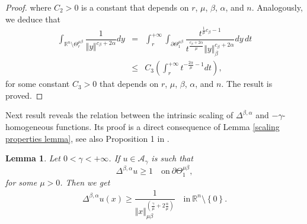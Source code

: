 \documentclass[10pt, leqno]{article}
\newtheorem{lemma}[theorem]{Lemma}
\theoremstyle{definition}
\theoremstyle{remark}
\numberwithin{equation}{section}
\begin{document}
\begin{proof}
where $C_{2}>0$ is a constant that depends on $r$, $\mu$, $\beta$, $\alpha$, and $n$. Analogously, we deduce that
\begin{eqnarray}
\int_{\mathbb{R}^{n} \setminus \Theta^{\mu \beta}_{r}} \dfrac{1}{\Vert y \Vert^{c_{\beta_{}}+2\alpha}} dy & = & \nonumber \int_{r}^{+\infty}\int_{\partial \Theta^{\mu \beta}_{1}} \dfrac{t^{\frac{1}{\mu}c_{\beta}-1}}{t^{\frac{c_{\beta} + 2\alpha}{\mu}}\Vert y \Vert_{\beta}^{c_{\beta_{}}+2\alpha}} dy \, dt \\ \nonumber
& \leq & C_{3} \left(\int_{r}^{+\infty} t^{-\frac{2\alpha}{\mu}-1} dt \right),
\end{eqnarray}
for some constant $C_{3}>0$ that depends on $r$, $\mu$, $\beta$, $\alpha$, and $n$. The result is proved.
\end{proof}

Next result reveals the relation between the intrinsic scaling of $\Delta^{\beta, \alpha}$ and $-\gamma$-homogeneous functions. Its proof is a direct consequence of Lemma \ref{scaling properties lemma}, see also Proposition 1 in \cite{CWW}.
\begin{lemma}
\label{scaling lemma on the anisotropic sphere}
Let $0 < \gamma < +\infty$. If $u \in \mathcal{A}_{\gamma}$ is such that
$$
\Delta^{\beta, \alpha}u \geq 1 \quad \text{on} \ \partial \Theta^{\mu \beta}_{1},
$$
for some $\mu >0$. Then we get
\begin{eqnarray}
\Delta^{\beta, \alpha}u(x) \geq \dfrac{1}{\Vert x \Vert_{\mu \beta}^{\left( \frac{\gamma}{\mu} + 2 \frac{\alpha}{\mu} \right)}}\quad \text{in} \ \mathbb{R}^{n} \setminus \left\lbrace 0 \right\rbrace.
\end{eqnarray}
\end{lemma}
\end{document}
